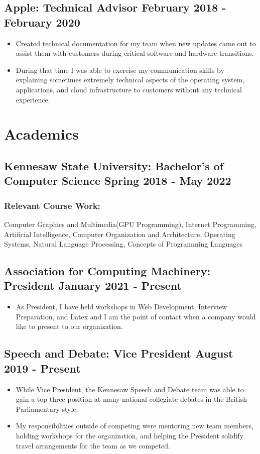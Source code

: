 \documentclass{article}
\begin{document}
\subsection{\large{Apple}: Technical Advisor \hfill \small{February 2018 - February 2020}}
\begin{itemize}
\setlength\itemsep{.1em}
	\item Created technical documentation for my team when new updates came out to assist them with customers during critical software and hardware transitions.
	\item During that time I was able to exercise my communication skills by explaining sometimes extremely technical aspects of the operating system, applications, and cloud infrastructure to customers without any technical experience. 
\end{itemize}
\section{Academics}
\subsection{\large Kennesaw State University: Bachelor's of Computer Science \hfill \small Spring 2018 - May 2022}
\subsubsection{Relevant Course Work:} Computer Graphics and Multimedia(GPU Programming), Internet Programming, Artificial Intelligence, Computer Organization and Architecture, Operating Systems, Natural Language Processing, Concepts of Programming Languages
\subsection{\large Association for Computing Machinery: President \hfill \small January 2021 - Present}
\begin{itemize}
\setlength\itemsep{.1em}
	\item As President, I have held workshops in Web Development, Interview Preparation, and Latex and I am the point of contact when a company would like to present to our organization. 
\end{itemize}
\subsection{\large Speech and Debate: Vice President \hfill \small August 2019 - Present}
\begin{itemize}
\setlength\itemsep{.1em}
	\item While Vice President, the Kennesaw Speech and Debate team was able to gain a top three position at many national collegiate debates in the British Parliamentary style. 
	\item My responsibilities outside of competing were mentoring new team members, holding workshops for the organization, and helping the President solidify travel arrangements for the team as we competed. 
\end{itemize}
\end{document}

